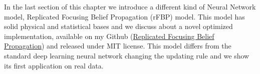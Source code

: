\documentclass{standalone}
\begin{document}
In the last section of this chapter we introduce a different kind of Neural Network model, \textsf{Replicated Focusing Belief Propagation} (rFBP) model.
This model has solid physical and statistical bases and we discuss about a novel optimized implementation, available on my Github (\href{https://github.com/Nico-Curti/rFBP}{Replicated Focusing Belief Propagation}) and released under MIT license.
This model differs from the standard deep learning neural network changing the updating rule and we show its first application on real data.
\end{document}
